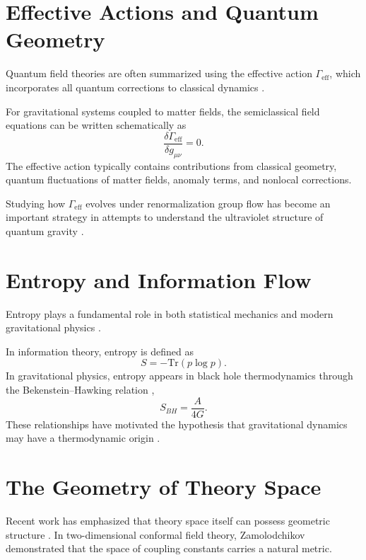 \documentclass[12pt,a4paper]{article}
\theoremstyle{plain}
\theoremstyle{definition}
\theoremstyle{remark}
\begin{document}
\section{Effective Actions and Quantum Geometry}

Quantum field theories are often summarized using the effective action
$\Gamma_{\text{eff}}$, which incorporates all quantum corrections to
classical dynamics \cite{PeskinSchroeder,ZinnJustin}.

For gravitational systems coupled to matter fields, the semiclassical
field equations can be written schematically as
\begin{equation}
\frac{\delta \Gamma_{\text{eff}}}{\delta g_{\mu\nu}} = 0.
\end{equation}
The effective action typically contains contributions from classical
geometry, quantum fluctuations of matter fields, anomaly terms, and
nonlocal corrections.

Studying how $\Gamma_{\text{eff}}$ evolves under renormalization group
flow has become an important strategy in attempts to understand the
ultraviolet structure of quantum gravity \cite{WeinbergQFT,Reuter1998}.

\section{Entropy and Information Flow}

Entropy plays a fundamental role in both statistical mechanics and
modern gravitational physics \cite{LandauStat,Callen,Jaynes1957}.

In information theory, entropy is defined as
\begin{equation}
S = -\mathrm{Tr}(p \log p).
\end{equation}
In gravitational physics, entropy appears in black hole thermodynamics
through the Bekenstein--Hawking relation \cite{Bekenstein1973,Hawking1975},
\begin{equation}
S_{BH} = \frac{A}{4G}.
\end{equation}
These relationships have motivated the hypothesis that gravitational
dynamics may have a thermodynamic origin \cite{Padmanabhan2010,
Padmanabhan2015}.

\section{The Geometry of Theory Space}

Recent work has emphasized that theory space itself can possess
geometric structure \cite{Zamolodchikov1986,PannellStergiou2025}. In
two-dimensional conformal field theory, Zamolodchikov demonstrated that
the space of coupling constants carries a natural metric.
\end{document}
